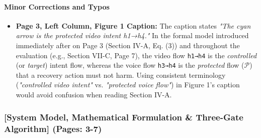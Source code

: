 \documentclass[11pt,a4paper]{article}
\begin{document}
\paragraph{Minor Corrections and Typos}
\begin{itemize}[leftmargin=1.8em,itemsep=2pt]
\item \textbf{Page 3, Left Column, Figure 1 Caption:} The caption states \emph{"The cyan arrow is the protected video intent h1→h4."} In the formal model introduced immediately after on Page 3 (Section IV-A, Eq. (3)) and throughout the evaluation (e.g., Section VII-C, Page 7), the video flow \texttt{h1→h4} is the \emph{controlled} (or \emph{target}) intent flow, whereas the voice flow \texttt{h3→h4} is the \emph{protected} flow ($\mathcal{P}$) that a recovery action must not harm. Using consistent terminology (\emph{"controlled video intent"} vs. \emph{"protected voice flow"}) in Figure 1's caption would avoid confusion when reading Section IV-A.
\end{itemize}
\subsubsection*{[System Model, Mathematical Formulation \& Three-Gate Algorithm] (Pages: 3-7)}
\end{document}
